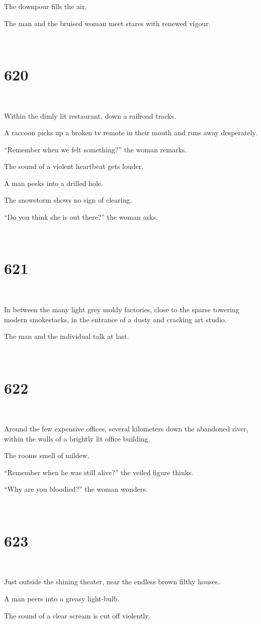 \documentclass{report}
\begin{document}
The downpour fills the air.

The man and the bruised woman meet stares with renewed vigour.

~
\chapter*{620}
~

Within the dimly lit restaurant, down a railroad tracks.

A raccoon picks up a broken tv remote in their mouth and runs away desperately.

``Remember when we felt something?'' the woman remarks.

The sound of a violent heartbeat gets louder.

A man peeks into a drilled hole.

The snowstorm shows no sign of clearing.

``Do you think she is out there?'' the woman asks.

~
\chapter*{621}
~

In between the many light grey moldy factories, close to the sparse towering modern smokestacks, in the entrance of a dusty and cracking art studio.

The man and the individual talk at last.

~
\chapter*{622}
~

Around the few expensive offices, several kilometers down the abandoned river, within the walls of a brightly lit office building.

The rooms smell of mildew.

``Remember when he was still alive?'' the veiled figure thinks.

``Why are you bloodied?'' the woman wonders.

~
\chapter*{623}
~

Just outside the shining theater, near the endless brown filthy houses.

A man peers into a greasy light-bulb.

The sound of a clear scream is cut off violently.
\end{document}
